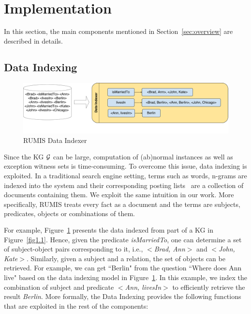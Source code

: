\section{Implementation}

In this section, the main components mentioned in Section~\ref{sec:overview} are described in details.

\subsection{Data Indexing}
\label{data_indexing}

\begin{figure}[h]
\centering
\includegraphics[width=1\textwidth]{figures/data_indexing}
\caption{RUMIS Data Indexer}
\label{data_indexing}
\end{figure}

Since the KG $\mathcal{G}$ can be large, computation of (ab)normal instances as well as exception witness sets is time-consuming. To overcome this issue, data indexing is exploited. In a traditional search engine setting, terms such as words, n-grams are indexed into the system and their corresponding posting lists~\cite{ref47} are a collection of documents containing them. We exploit the same intuition in our work. More specifically, RUMIS treats every fact as a document and the terms are subjects, predicates, objects or combinations of them.

For example, Figure~\ref{data_indexing} presents the data indexed from part of a KG in Figure~\ref{fig1.1}. Hence, given the predicate \textit{isMarriedTo}, one can determine a set of subject-object pairs corresponding to it, i.e., \textit{$<$Brad, Ann$>$} and \textit{$<$John, Kate$>$}. Similarly, given a subject and a relation, the set of objects can be retrieved. For example, we can get ``Berlin" from the question ``Where does Ann live" based on the data indexing model in Figure~\ref{data_indexing}. In this example, we index the combination of subject and predicate \textit{$<$Ann, livesIn$>$} to efficiently retrieve the result \textit{Berlin}. More formally, the Data Indexing provides the following functions that are exploited in the rest of the components:

